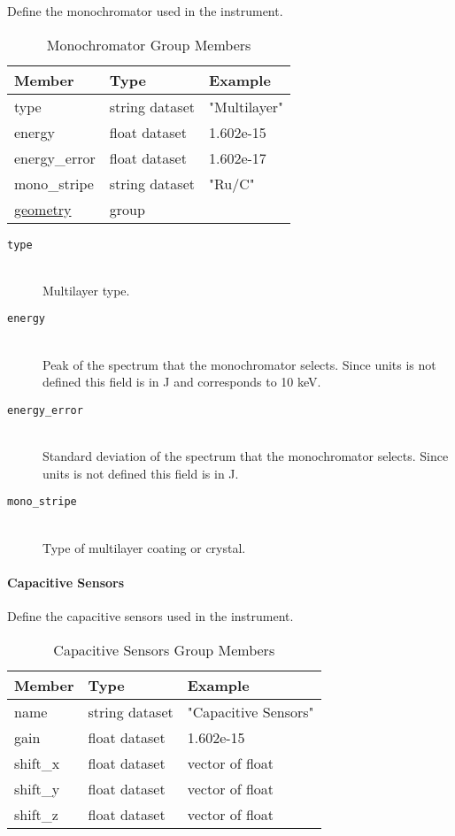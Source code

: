 Define the monochromator used in the instrument.

\begin{table}[h!]\sffamily \footnotesize
\centering
\caption{Monochromator Group Members}
\begin{tabular}{l l l}
\toprule
\bfseries Member     & \bfseries Type & \bfseries Example \\
\midrule
type & string dataset & "Multilayer" \\
energy & float dataset & 1.602e-15 \\
energy\_error & float dataset & 1.602e-17 \\
mono\_stripe & string dataset & "Ru/C" \\
\hyperref[table:geometry]{geometry} &  group & \\
\bottomrule
\end{tabular}
\end{table}

\begin{description}
\item[\tt {type}] \hfill \\
{Multilayer type.}

\item[\tt {energy}] \hfill \\
{Peak of the spectrum that the  monochromator selects. Since units is not
defined this field is in J and corresponds to 10 keV.}

\item[\tt {energy\_error}] \hfill \\
{Standard deviation of the spectrum that the monochromator selects. Since units
is not defined this field is in J.}

\item[\tt {mono\_stripe}] \hfill \\
{Type of multilayer coating or crystal.}
\end{description}

\paragraph{Capacitive Sensors}
\label{table:capacitive}

Define the capacitive sensors used in the instrument.

\begin{table}[h!]\sffamily \footnotesize
\centering
\caption{Capacitive Sensors Group Members}
\begin{tabular}{l l l}
\toprule
\bfseries Member     & \bfseries Type & \bfseries Example \\
\midrule
name & string dataset & "Capacitive Sensors" \\
gain & float dataset & 1.602e-15 \\
shift\_x & float dataset & vector of float \\
shift\_y & float dataset & vector of float \\
shift\_z & float dataset & vector of float \\
\bottomrule
\end{tabular}
\end{table}

